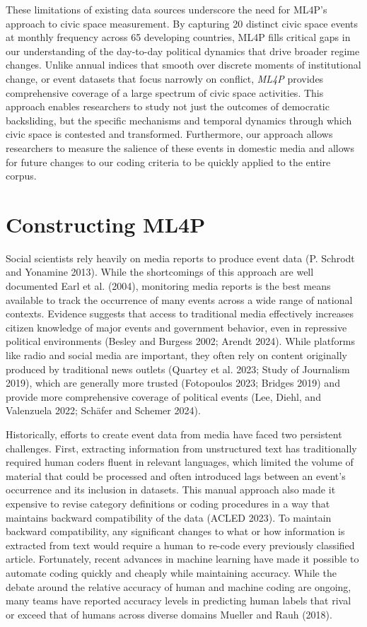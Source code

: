 \documentclass[
  letterpaper,
  DIV=11,
  numbers=noendperiod]{scrartcl}
\begin{document}
These limitations of existing data sources underscore the need for
ML4P's approach to civic space measurement. By capturing 20 distinct
civic space events at monthly frequency across 65 developing countries,
ML4P fills critical gaps in our understanding of the day-to-day
political dynamics that drive broader regime changes. Unlike annual
indices that smooth over discrete moments of institutional change, or
event datasets that focus narrowly on conflict, \emph{ML4P} provides
comprehensive coverage of a large spectrum of civic space activities.
This approach enables researchers to study not just the outcomes of
democratic backsliding, but the specific mechanisms and temporal
dynamics through which civic space is contested and transformed.
Furthermore, our approach allows researchers to measure the salience of
these events in domestic media and allows for future changes to our
coding criteria to be quickly applied to the entire corpus.

\hypertarget{sec-data}{%
\section{Constructing ML4P}\label{sec-data}}

Social scientists rely heavily on media reports to produce event data
(P. Schrodt and Yonamine 2013). While the shortcomings of this approach
are well documented Earl et al. (2004), monitoring media reports is the
best means available to track the occurrence of many events across a
wide range of national contexts. Evidence suggests that access to
traditional media effectively increases citizen knowledge of major
events and government behavior, even in repressive political
environments (Besley and Burgess 2002; Arendt 2024). While platforms
like radio and social media are important, they often rely on content
originally produced by traditional news outlets (Quartey et al. 2023;
Study of Journalism 2019), which are generally more trusted (Fotopoulos
2023; Bridges 2019) and provide more comprehensive coverage of political
events (Lee, Diehl, and Valenzuela 2022; Schäfer and Schemer 2024).

Historically, efforts to create event data from media have faced two
persistent challenges. First, extracting information from unstructured
text has traditionally required human coders fluent in relevant
languages, which limited the volume of material that could be processed
and often introduced lags between an event's occurrence and its
inclusion in datasets. This manual approach also made it expensive to
revise category definitions or coding procedures in a way that maintains
backward compatibility of the data (ACLED 2023). To maintain backward
compatibility, any significant changes to what or how information is
extracted from text would require a human to re-code every previously
classified article. Fortunately, recent advances in machine learning
have made it possible to automate coding quickly and cheaply while
maintaining accuracy. While the debate around the relative accuracy of
human and machine coding are ongoing, many teams have reported accuracy
levels in predicting human labels that rival or exceed that of humans
across diverse domains Mueller and Rauh (2018).
\end{document}
